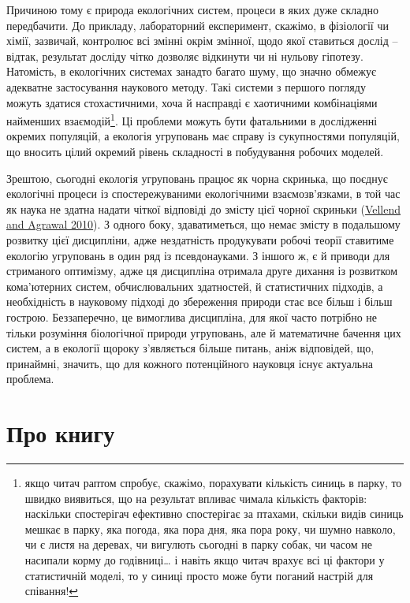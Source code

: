 \documentclass[
  11pt,
]{book}
\begin{document}
Причиною тому є природа екологічних систем, процеси в яких дуже складно передбачити. До прикладу, лабораторний експеримент, скажімо, в фізіології чи хімії, зазвичай, контролює всі змінні окрім змінної, щодо якої ставиться дослід -- відтак, результат досліду чітко дозволяє відкинути чи ні нульову гіпотезу. Натомість, в екологічних системах занадто багато шуму, що значно обмежує адекватне застосування наукового методу. Такі системи з першого погляду можуть здатися стохастичними, хоча й насправді є хаотичними комбінаціями найменших взаємодій\footnote{якщо читач раптом спробує, скажімо, порахувати кількість синиць в парку, то швидко виявиться, що на результат впливає чимала кількість факторів: наскільки спостерігач ефективно спостерігає за птахами, скільки видів синиць мешкає в парку, яка погода, яка пора дня, яка пора року, чи шумно навколо, чи є листя на деревах, чи вигулють сьогодні в парку собак, чи часом не насипали корму до годівниці\ldots{} і навіть якщо читач врахує всі ці фактори у статистичній моделі, то у синиці просто може бути поганий настрій для співання!}. Ці проблеми можуть бути фатальними в дослідженні окремих популяцій, а екологія угруповань має справу із сукупностями популяцій, що вносить цілий окремий рівень складності в побудування робочих моделей.

Зрештою, сьогодні екологія угруповань працює як чорна скринька, що поєднує екологічні процеси із спостережуваними екологічними взаємозв'язками, в той час як наука не здатна надати чіткої відповіді до змісту цієї чорної скриньки (\href{https://doi.org/10.1086/652373}{Vellend and Agrawal 2010}). З одного боку, здаватиметься, що немає змісту в подальшому розвитку цієї дисципліни, адже нездатність продукувати робочі теорії ставитиме екологію угруповань в один ряд із псевдонауками. З іншого ж, є й приводи для стриманого оптимізму, адже ця дисципліна отримала друге дихання із розвитком кома'ютерних систем, обчислювальних здатностей, й статистичних підходів, а необхідність в науковому підході до збереження природи стає все більш і більш гострою. Беззаперечно, це вимоглива дисципліна, для якої часто потрібно не тільки розуміння біологічної природи угруповань, але й математичне бачення цих систем, а в екології щороку з'являється більше питань, аніж відповідей, що, принаймні, значить, що для кожного потенційного науковця існує актуальна проблема.

\chapter{Про книгу}\label{about-book}
\end{document}
